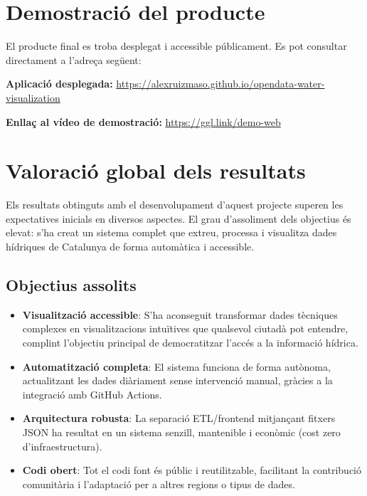 
\section{Demostració del producte}

El producte final es troba desplegat i accessible públicament. Es pot consultar directament a l'adreça següent:

\textbf{Aplicació desplegada:} \url{https://alexruizmaso.github.io/opendata-water-visualization}

\textbf{Enllaç al vídeo de demostració:} \url{https://ggl.link/demo-web}


\section{Valoració global dels resultats}

Els resultats obtinguts amb el desenvolupament d'aquest projecte superen les expectatives inicials en diversos aspectes. El grau d'assoliment dels objectius és elevat: s'ha creat un sistema complet que extreu, processa i visualitza dades hídriques de Catalunya de forma automàtica i accessible.

\subsection{Objectius assolits}

\begin{itemize}
    \item \textbf{Visualització accessible}: S'ha aconseguit transformar dades tècniques complexes en visualitzacions intuïtives que qualsevol ciutadà pot entendre, complint l'objectiu principal de democratitzar l'accés a la informació hídrica.
    \item \textbf{Automatització completa}: El sistema funciona de forma autònoma, actualitzant les dades diàriament sense intervenció manual, gràcies a la integració amb GitHub Actions.
    \item \textbf{Arquitectura robusta}: La separació ETL/frontend mitjançant fitxers JSON ha resultat en un sistema senzill, mantenible i econòmic (cost zero d'infraestructura).
    \item \textbf{Codi obert}: Tot el codi font és públic i reutilitzable, facilitant la contribució comunitària i l'adaptació per a altres regions o tipus de dades.
\end{itemize}

